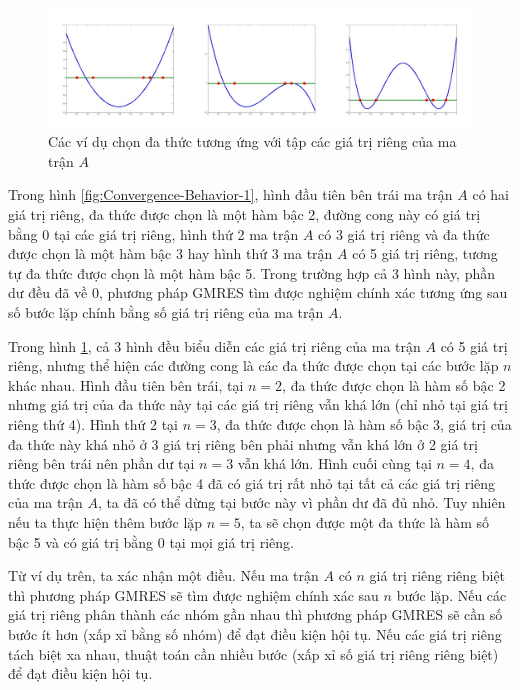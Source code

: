 \documentclass[14pt, a4paper]{article}
\numberwithin{equation}{section}
\numberwithin{algorithm}{section}
\numberwithin{figure}{section}
\numberwithin{dl}{section}
\numberwithin{md}{section}
\numberwithin{bd}{section}
\numberwithin{dn}{section}
\numberwithin{hq}{section}
\begin{document}
\begin{figure}[h!] \centering

    \includegraphics[scale=0.5]{Convergence-Behavior-2.jpg}
    \caption{Các ví dụ chọn đa thức tương ứng với tập các giá trị riêng của ma trận $A$}

    \label{fig:Convergence-Behavior-2}
\end{figure}

Trong hình \ref{fig:Convergence-Behavior-1}, hình đầu tiên bên trái ma trận $A$ có hai giá trị riêng, đa thức được chọn là một hàm bậc 2, đường cong này có giá trị bằng 0 tại các giá trị riêng, hình thứ 2 ma trận $A$ có 3 giá trị riêng và đa thức được chọn là một hàm bậc 3 hay hình thứ 3 ma trận $A$ có 5 giá trị riêng, tương tự đa thức được chọn là một hàm bậc 5. Trong trường hợp cả 3 hình này, phần dư đều đã về 0, phương pháp GMRES tìm được nghiệm chính xác tương ứng sau số bước lặp chính bằng số giá trị riêng của ma trận $A$.

Trong hình \ref{fig:Convergence-Behavior-2}, cả 3 hình đều biểu diễn các giá trị riêng của ma trận $A$ có 5 giá trị riêng, nhưng thể hiện các đường cong là các đa thức được chọn tại các bước lặp $n$ khác nhau. Hình đầu tiên bên trái, tại $n=2$, đa thức được chọn là hàm số bậc 2 nhưng giá trị của đa thức này tại các giá trị riêng vẫn khá lớn (chỉ nhỏ tại giá trị riêng thứ 4). Hình thứ 2 tại $n=3$, đa thức được chọn là hàm số bậc 3, giá trị của đa thức này khá nhỏ ở 3 giá trị riêng bên phải nhưng vẫn khá lớn ở 2 giá trị riêng bên trái nên phần dư tại $n=3$ vẫn khá lớn. Hình cuối cùng tại $n=4$, đa thức được chọn là hàm số bậc 4 đã có giá trị rất nhỏ tại tất cả các giá trị riêng của ma trận $A$, ta đã có thể dừng tại bước này vì phần dư đã đủ nhỏ. Tuy nhiên nếu ta thực hiện thêm bước lặp $n=5$, ta sẽ chọn được một đa thức là hàm số bậc 5 và có giá trị bằng 0 tại mọi giá trị riêng.

Từ ví dụ trên, ta xác nhận một điều. Nếu ma trận $A$ có $n$ giá trị riêng riêng biệt thì phương pháp GMRES sẽ tìm được nghiệm chính xác sau $n$ bước lặp. Nếu các giá trị riêng phân thành các nhóm gần nhau thì phương pháp GMRES sẽ cần số bước ít hơn (xấp xỉ bằng số nhóm) để đạt điều kiện hội tụ. Nếu các giá trị riêng tách biệt xa nhau, thuật toán cần nhiều bước (xấp xỉ số giá trị riêng riêng biệt) để đạt điều kiện hội tụ.
\end{document}
